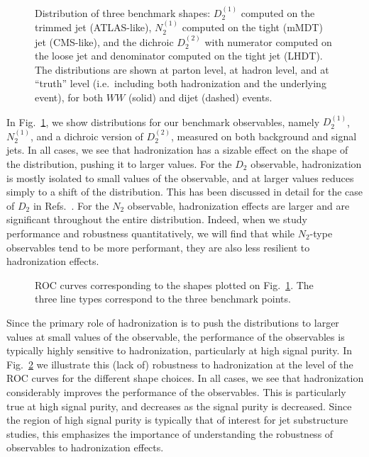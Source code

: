 \begin{figure}
  \caption{Distribution of three benchmark shapes: $D_2^{(1)}$
    computed on the trimmed jet (ATLAS-like), $N_2^{(1)}$ computed on
    the tight (mMDT) jet (CMS-like), and the dichroic $D_2^{(2)}$ with numerator
    computed on the loose jet and denominator computed on the tight
    jet (LHDT). The distributions are shown at parton level, at hadron level,
    and at ``truth'' level (i.e.\ including both hadronization and the
    underlying event), for both $WW$ (solid) and dijet (dashed)
    events.}\label{fig:SM_jetsub_2prong:shape-distribution}
\end{figure}

In Fig.~\ref{fig:SM_jetsub_2prong:shape-distribution}, we show
distributions for our benchmark observables, namely $D_2^{(1)}$, $N_2^{(1)}$, and a dichroic version of $D_2^{(2)}$, measured on both background and signal jets.
%
In all cases, we see that hadronization has a sizable effect on the shape of the distribution, pushing it to larger values.
%
For the $D_2$ observable, hadronization is mostly isolated to small values of the observable, and at larger values reduces simply to a shift of the distribution.
%
This has been discussed in detail for the case of $D_2$ in Refs.~\cite{Larkoski:2015kga,Larkoski:2017cqq,Larkoski:2017iuy}.
%
For the $N_2$ observable, hadronization effects are larger and are significant throughout the entire distribution.
%
Indeed, when we study performance and robustness quantitatively, we will find that while $N_2$-type observables tend to be more performant, they are also less resilient to hadronization effects. 

\begin{figure}
  \caption{ROC curves corresponding to the shapes plotted on
    Fig.~\ref{fig:SM_jetsub_2prong:shape-distribution}. The three line types correspond
    to the three benchmark points.}\label{fig:SM_jetsub_2prong:rocs}
\end{figure}


Since the primary role of hadronization is to push the distributions to larger values at small values of the observable, the performance of the observables is typically highly sensitive to hadronization, particularly at high signal purity.
%
In Fig.~\ref{fig:SM_jetsub_2prong:rocs} we illustrate this (lack of) robustness to hadronization at the level of the ROC curves for the different shape choices.
%
In all cases, we see that hadronization considerably improves the performance of the observables.
%
This is particularly true at high signal purity, and decreases as the signal purity is decreased.
%
Since the region of high signal purity is typically that of interest for jet substructure studies, this emphasizes the importance of understanding the robustness of observables to hadronization effects.

